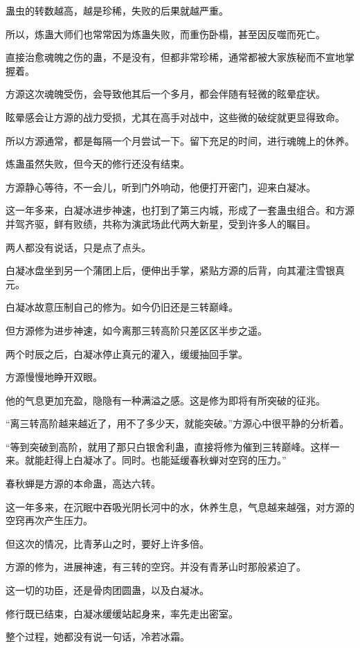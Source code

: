 \begin{this_body}
蛊虫的转数越高，越是珍稀，失败的后果就越严重。

所以，炼蛊大师们也常常因为炼蛊失败，而重伤卧榻，甚至因反噬而死亡。

直接治愈魂魄之伤的蛊，不是没有，但都非常珍稀，通常都被大家族秘而不宣地掌握着。

方源这次魂魄受伤，会导致他其后一个多月，都会伴随有轻微的眩晕症状。

眩晕感会让方源的战力受损，尤其在高手对战中，这些微的破绽就更显得致命。

所以方源通常，都是每隔一个月尝试一下。留下充足的时间，进行魂魄上的休养。

炼蛊虽然失败，但今天的修行还没有结束。

方源静心等待，不一会儿，听到门外响动，他便打开密门，迎来白凝冰。

这一年多来，白凝冰进步神速，也打到了第三内城，形成了一套蛊虫组合。和方源并驾齐驱，鲜有败绩，共称为演武场此代两大新星，受到许多人的瞩目。

两人都没有说话，只是点了点头。

白凝冰盘坐到另一个蒲团上后，便伸出手掌，紧贴方源的后背，向其灌注雪银真元。

白凝冰故意压制自己的修为。如今仍旧还是三转巅峰。

但方源修为进步神速，如今离那三转高阶只差区区半步之遥。

两个时辰之后，白凝冰停止真元的灌入，缓缓抽回手掌。

方源慢慢地睁开双眼。

他的气息更加充盈，隐隐有一种满溢之感。这是修为即将有所突破的征兆。

“离三转高阶越来越近了，用不了多少天，就能突破。”方源心中很平静的分析着。

“等到突破到高阶，就用了那只白银舍利蛊，直接将修为催到三转巅峰。这样一来。就能赶得上白凝冰了。同时。也能延缓春秋蝉对空窍的压力。”

春秋蝉是方源的本命蛊，高达六转。

这一年多来，在沉眠中吞吸光阴长河中的水，休养生息，气息越来越强，对方源的空窍再次产生压力。

但这次的情况，比青茅山之时，要好上许多倍。

方源的修为，进展神速，有三转的空窍。并没有青茅山时那般紧迫了。

这一切的功臣，还是骨肉团圆蛊，以及白凝冰。

修行既已结束，白凝冰缓缓站起身来，率先走出密室。

整个过程，她都没有说一句话，冷若冰霜。


\end{this_body}
